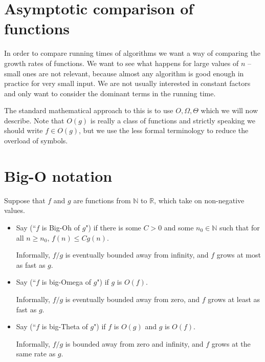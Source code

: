 \section{Asymptotic comparison of functions}
In order to compare running times of algorithms we want a way of comparing
the growth rates of functions. We want to see what happens for large values of $n$ 
-- small ones are not relevant, because almost any algorithm is good enough in practice for very small input. 
We are not usually interested in constant factors and only want to consider the dominant terms in the running time.

The standard mathematical approach to this is to use 
$O, \Omega, \Theta$ which we will now describe. 
Note that $O(g)$ is really a class of functions and strictly speaking 
we should write $f \in O(g)$, but we use the less formal terminology to reduce the overload of symbols.

\section{Big-O notation}
\begin{Definition}
Suppose that $f$ and $g$ are functions from $\mathbb{N}$ to $\mathbb{R}$, 
which take on non-negative values. 
\begin{itemize}
\item Say  (``$f$ is Big-Oh of $g$") if there is
some $C > 0$ and some $n_0 \in \mathbb{N}$ such that for all $n \geq
n_0$, $f(n) \leq C g(n)$. 

Informally, $f/g$ is eventually bounded away from infinity, and $f$ grows at most as fast as $g$.

\item Say  (``$f$ is big-Omega of $g$") if $g$ is
$O(f)$. 

Informally, $f/g$ is eventually bounded away from zero, and $f$ grows at least as fast as $g$.
\item Say  (``$f$ is big-Theta of $g$") if $f$ is 
$O(g)$ and $g$ is $O(f)$. 

Informally, $f/g$ is bounded away from zero and infinity, and $f$ grows at the same rate as $g$.
\end{itemize}
\end{Definition}


